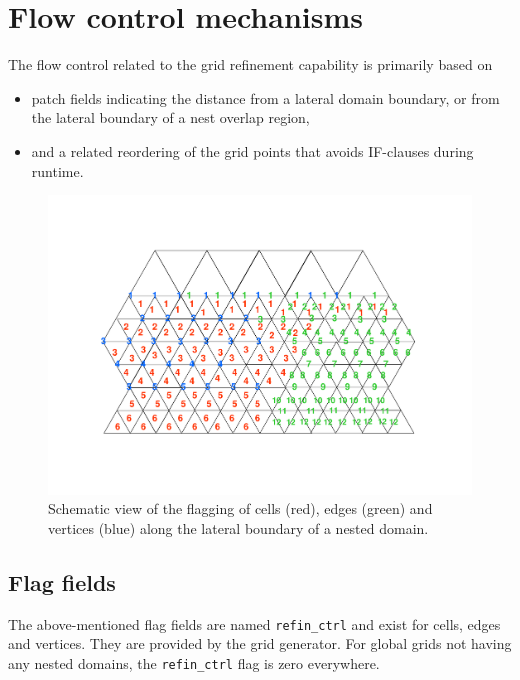\documentclass[11pt]{article}
\begin{document}
\section{Flow control mechanisms}

The flow control related to the grid refinement capability is primarily based on
\begin{itemize}
\item
patch fields indicating the distance from a lateral domain boundary, or from the lateral boundary of a nest overlap region,
\item
and a related reordering of the grid points that avoids IF-clauses during runtime.
\end{itemize}


\begin{figure}[t!]
\vspace{-2cm}

\centering

\includegraphics[width=\textwidth]{./icondoc_fig1}
\vspace{-2cm}

 \caption{Schematic view of the flagging of cells (red), edges (green) and vertices (blue) along the
lateral boundary of a nested domain.
}  

\end{figure}

\subsection{Flag fields}

The above-mentioned flag fields are named \verb+refin_ctrl+ and exist for cells, edges and vertices. 
They are provided by the grid generator. For global grids not having any nested domains, the \verb+refin_ctrl+ flag
is zero everywhere. 
\end{document}
